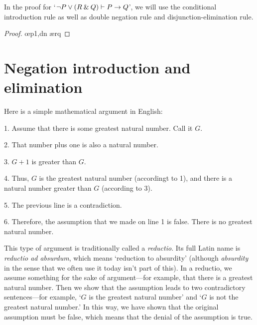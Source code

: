 \begin{earg}
\item In the proof for `${\neg} P \vee (R \mathbin{\&} Q) \vdash P \rightarrow Q$', we will use the conditional introduction rule as well as double negation rule and disjunction-elimination rule. 

\begin{proof}
	 \pr{}	
	\open
		\as{}
		 
		 \oe{p1,dn}
		 \ae{rq}
	\close
\end{proof}


\end{earg}


\section{Negation introduction and elimination}

Here is a simple mathematical argument in English:
\begin{earg}
\item[1.] Assume that there is some greatest natural number. Call it $G$.
\item[2.] That number plus one is also a natural number.
\item[3.] $G+1$ is greater than $G$.
\item[4.] Thus, $G$ is the greatest natural number (accordingt to 1), and there is a natural number greater than $G$ (according to 3).
\item[5.] The previous line is a contradiction.
\item[6.] Therefore, the assumption that we made on line 1 is false. There is no greatest natural number.
\end{earg}
This type of argument is traditionally called a \emph{reductio}. Its full Latin name is \emph{reductio ad absurdum}, which means `reduction to absurdity' (although \textit{absurdity} in the sense that we often use it today isn't part of this). In a reductio, we assume something for the sake of argument---for example, that there is a greatest natural number. Then we show that the assumption leads to two contradictory sentences---for example, `$G$ is the greatest natural number' and `$G$ is not the greatest natural number.' In this way, we have shown that the original assumption must be false, which means that the denial of the assumption is true. 

